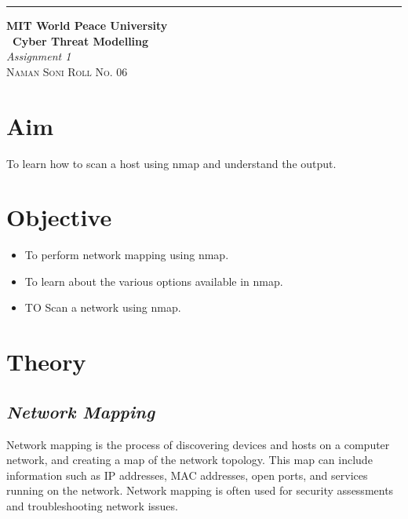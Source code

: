 \documentclass{article}
\begin{document}
\begin{titlepage} %

	\raggedleft\rule{1pt}{\textheight} %
	\hspace{0.05\textwidth} %
	\parbox[b]{0.75\textwidth}
    { %
		
		{\Huge\bfseries MIT World Peace University \\[0.5\baselineskip] \ Cyber Threat Modelling}\\[2\baselineskip] %
		{\large\textit{Assignment 1}}\\[4\baselineskip] %
		{\Large\textsc{Naman Soni Roll No. 06}} %
		
		\vspace{0.5\textheight} %
	}

\end{titlepage}
\tableofcontents
\pagebreak
\section{\textbf{Aim}}
To learn how to scan a host using nmap and understand the output.

\section{\textbf{Objective}}
\begin{itemize}
    \item To perform network mapping using nmap.
    \item To learn about the various options available in nmap.
    \item TO Scan a network using nmap.
\end{itemize}

\section{\textbf{Theory}}
\subsection{\textbf{\textit{Network Mapping}}}
Network mapping is the  process of discovering devices and hosts on a computer network, and creating a map of the network topology. This map can include information such as IP addresses, MAC addresses, open ports, and services running on the network. Network mapping is often used for security assessments and troubleshooting network issues.
\end{document}
